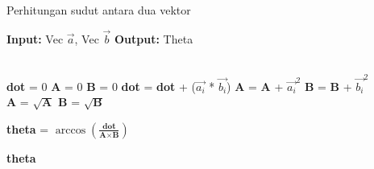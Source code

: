 \documentclass[a4paper,12pt]{article}
\begin{document}
\begin{algorithm}
    \caption{Perhitungan sudut antara dua vektor}
    \begin{algorithmic}[1]
        \State \textbf{Input:} Vec $\vec{a}$, Vec $\vec{b}$
        \State \textbf{Output:} Theta

        \State {}
        \EndIf\\

        \State \textbf{dot} = 0
        \State \textbf{A} = 0
        \State \textbf{B} = 0
        \State \textbf{dot} = \textbf{dot} + ($\vec{a_i}$ * $\vec{b_i}$)
        \State \textbf{A} = \textbf{A} + $\vec{a_i}^2$
        \State \textbf{B} = \textbf{B} + $\vec{b_i}^2$
        \EndFor\\

        \State \textbf{A} = $\sqrt{\textbf{A}}$
        \State \textbf{B} = $\sqrt{\textbf{B}}$

        \State \textbf{theta} = $\arccos \left( \frac{\textbf{dot}}{\textbf{A} \times \textbf{B}} \right)$

        \State \Return \textbf{theta}

    \end{algorithmic}
\end{algorithm}
\end{document}
